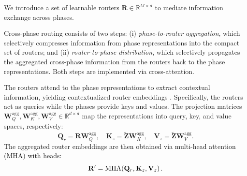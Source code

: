 We introduce a set of learnable routers $\mathbf{R}\in\mathbb{R}^{M\times d}$ to mediate information exchange across phases.

Cross-phase routing consists of two steps:
(i) \emph{phase-to-router aggregation}, which selectively compresses information from phase representations into the compact set of routers; and (ii) \emph{router-to-phase distribution}, which selectively propagates the aggregated cross-phase information from the routers back to the phase representations. Both steps are implemented via cross-attention.

The routers attend to the phase representations to extract contextual information, yielding contextualized router embeddings
.
Specifically, the routers act as queries while the phases provide keys and values. The projection matrices
$\mathbf{W}_Q^{\text{agg}},\mathbf{W}_K^{\text{agg}},\mathbf{W}_V^{\text{agg}}\in\mathbb{R}^{d\times d}$
map the representations into query, key, and value spaces, respectively:
\begin{equation}
\mathbf{Q}_r=\mathbf{R}\mathbf{W}_Q^{\text{agg}},\quad
\mathbf{K}_z=\tilde{\mathbf{Z}}\mathbf{W}_K^{\text{agg}},\quad
\mathbf{V}_z=\tilde{\mathbf{Z}}\mathbf{W}_V^{\text{agg}}.
\end{equation}
The aggregated router embeddings are then obtained via multi-head attention (MHA) with  heads:
\begin{equation}
\mathbf{R}'=\mathrm{MHA}\!\left(\mathbf{Q}_r,\mathbf{K}_z,\mathbf{V}_z\right).
\end{equation}

